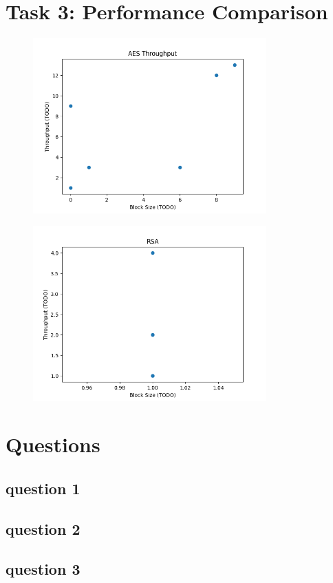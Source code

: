 \documentclass[11pt]{article}
\begin{document}
\section*{Task 3: Performance Comparison}
\begin{figure}[h!]
	\centering
	\includegraphics[width=0.8\textwidth]{./plts/aes.png}
\end{figure}

\begin{figure}[h!]
	\centering
	\includegraphics[width=0.8\textwidth]{./plts/rsa.png}
\end{figure}

\section*{Questions}
\subsection*{question 1}
\subsection*{question 2}
\subsection*{question 3}
\end{document}
